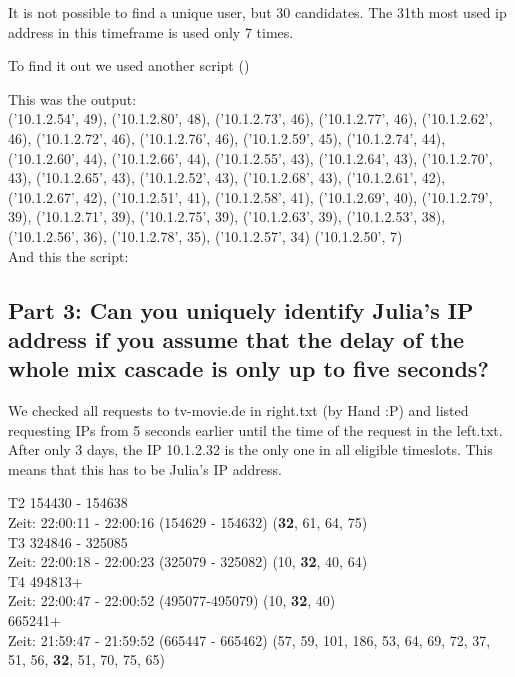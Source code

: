 It is not possible to find a unique user, but 30 candidates. The 31th most used ip address in this timeframe is used only 7 times.

To find it out we used another script ()

This was the output:\\

('10.1.2.54', 49), ('10.1.2.80', 48), ('10.1.2.73', 46), ('10.1.2.77', 46), ('10.1.2.62', 46), ('10.1.2.72', 46), ('10.1.2.76', 46), ('10.1.2.59', 45), ('10.1.2.74', 44), ('10.1.2.60', 44), ('10.1.2.66', 44), ('10.1.2.55', 43), ('10.1.2.64', 43), ('10.1.2.70', 43), ('10.1.2.65', 43), ('10.1.2.52', 43), ('10.1.2.68', 43), ('10.1.2.61', 42), ('10.1.2.67', 42), ('10.1.2.51', 41), ('10.1.2.58', 41), ('10.1.2.69', 40), ('10.1.2.79', 39), ('10.1.2.71', 39), ('10.1.2.75', 39), ('10.1.2.63', 39), ('10.1.2.53', 38), ('10.1.2.56', 36), ('10.1.2.78', 35), ('10.1.2.57', 34)
('10.1.2.50', 7)\\

And this the script:



\subsection{Part 3: Can you uniquely identify Julia’s IP address if you assume that the delay of the whole mix cascade is only up to five seconds?}

We checked all requests to tv-movie.de in right.txt (by Hand :P) and listed requesting IPs from 5 seconds earlier until the time of the request in the left.txt. After only 3 days, the IP 10.1.2.32 is the only one in all eligible timeslots. This means that this has to be Julia's IP address.

T2 154430 - 154638\\
Zeit: 22:00:11 - 22:00:16  (154629 - 154632)  (\textbf{32}, 61, 64, 75)\\
T3 324846 - 325085\\
Zeit: 22:00:18 - 22:00:23 (325079 - 325082) (10, \textbf{32}, 40, 64)\\
T4 494813+\\
Zeit: 22:00:47 - 22:00:52 (495077-495079) (10, \textbf{32}, 40)\\
665241+\\
Zeit: 21:59:47 - 21:59:52 (665447 - 665462) (57, 59, 101, 186, 53, 64, 69, 72, 37, 51, 56, \textbf{32}, 51, 70, 75, 65)